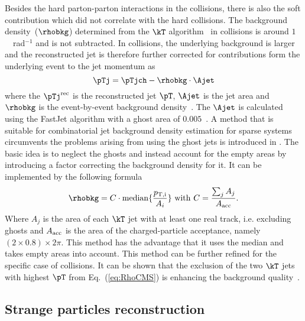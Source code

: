 \documentclass[ALICE,manyauthors]{cernphprep}
\begin{document}
Besides the hard parton-parton interactions in the collisions, there is also the soft contribution which did not correlate with the hard collisions.
The background density~($\rhobkg$) determined from the $\kT$ algorithm~\cite{Catani:1993hr, Ellis:1993tq} in \pp collisions is around $1$~\GeVc~rad$^{-1}$ and is not subtracted.
In \pPb collisions, the underlying background is larger and the reconstructed jet is therefore further corrected for contributions form the underlying event to the jet momentum as
\begin{equation}
\pTj = \pTjch - \rhobkg\cdot\Ajet
\label{eq:DeltaPt}
\end{equation}
where the $\pTj^{\rm rec}$ is the reconstructed jet $\pT$, $\Ajet$ is the jet area and $\rhobkg$ is the event-by-event background density~\cite{Cacciari:2007fd}.
The $\Ajet$ is calculated using the FastJet algorithm with a ghost area of $0.005$~\cite{Cacciari:2008gn}.
A method that is suitable for combinatorial jet background density estimation for sparse systems circumvents the problems arising from using the ghost jets is introduced in \cite{Chatrchyan:2012tt}.
The basic idea is to neglect the ghosts and instead account for the empty areas by introducing a factor correcting the background density for it.
It can be implemented by the following formula
\begin{equation}
\rhobkg = C\cdot{\rm median}\{\frac{p_{\rm T,i}}{A_{i}}\} ~ {\rm with}~ C = \frac{\sum_{j}A_{j}}{A_{\rm acc}}.
\label{eq:RhoCMS}
\end{equation}
Where $A_{j}$ is the area of each $\kT$ jet with at least one real track, i.e. excluding ghosts and $A_{\rm acc}$ is the area of the charged-particle acceptance, namely $(2 \times 0.8) \times 2\pi$.
This method has the advantage that it uses the median and takes empty areas into account.
This method can be further refined for the specific case of \pPb collisions.
It can be shown that the exclusion of the two $\kT$ jets with highest $\pT$ from Eq.~(\ref{eq:RhoCMS}) is enhancing the background quality~\cite{ALICE:2015umm, ALICE:2016faw}.

\subsection{Strange particles reconstruction}%
\label{sec:ParRec}
\end{document}

